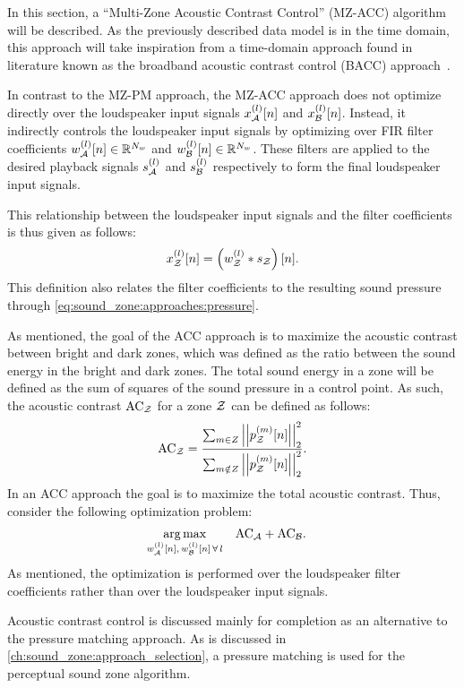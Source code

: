 In this section, a ``Multi-Zone Acoustic Contrast Control'' (MZ-ACC) algorithm will be described.
As the previously described data model is in the time domain, this approach will take inspiration from a time-domain approach found in literature known as the
broadband acoustic contrast control (BACC) approach~\cite{elliott2011regularisation, cai2014time, moller2016sound}.

In contrast to the MZ-PM approach, the MZ-ACC approach does not optimize directly over the loudspeaker input signals $x_{\mathcal{A}}^{(l)}[n]$ and $x_{\mathcal{B}}^{(l)}[n]$.
Instead, it indirectly controls the loudspeaker input signals by optimizing over 
FIR filter coefficients $w_{\mathcal{A}}^{(l)}[n]\in\mathbb{R}^{N_w}$ and $w_{\mathcal{B}}^{(l)}[n]\in\mathbb{R}^{N_w}$.
These filters are applied to the desired playback signals $s_{\mathcal{A}}^{(l)}$ and $s_{\mathcal{B}}^{(l)}$ respectively to form the final loudspeaker input signals.

This relationship between the loudspeaker input signals and the filter coefficients is thus given as follows:
\begin{equation}
    x_{\mathcal{Z}}^{(l)}[n] = \left(w_{\mathcal{Z}}^{(l)} \ast s_{\mathcal{Z}}\right)[n].
\end{equation}
This definition also relates the filter coefficients to the resulting sound pressure through \autoref{eq:sound_zone:approaches:pressure}.

As mentioned, the goal of the ACC approach is to maximize the acoustic contrast between bright and dark zones,
which was defined as the ratio between the sound energy in the bright and dark zones.
The total sound energy in a zone will be defined as the sum of squares of the sound pressure in a control point.
As such, the acoustic contrast $\text{AC}_{\mathcal{Z}}$ for a zone $\mathcal{Z}$ can be defined as follows: 
\begin{equation}
    \text{AC}_{\zz} = \frac{\sum_{m\in Z} \norm[2][2]{p_\zz^{(m)}[n]}}{\sum_{m\notin Z} \norm[2][2]{p_\zz^{(m)}[n]}}.
\end{equation}
In an ACC approach the goal is to maximize the total acoustic contrast.
Thus, consider the following optimization problem:
\begin{align}
    \operatorname*{arg\,max}_{w_{\mathcal{A}}^{(l)}[n],\,w_{\mathcal{B}}^{(l)}[n]\,\forall\,l}\quad 
       &\text{AC}_{\mathcal{A}} + \text{AC}_{\mathcal{B}}
   .
\end{align}
As mentioned, the optimization is performed over the loudspeaker filter coefficients rather than over the loudspeaker input signals.

Acoustic contrast control is discussed mainly for completion as an alternative to the pressure matching approach.
As is discussed in \autoref{ch:sound_zone:approach_selection}, a pressure matching is used for the perceptual sound zone algorithm.

